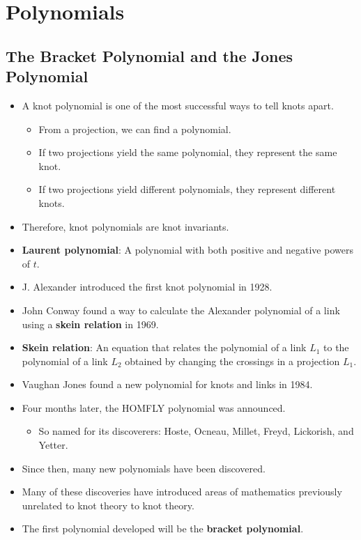 \documentclass[titlepage]{article}
\numberwithin{figure}{section}
\numberwithin{table}{section}
\numberwithin{equation}{section}
\begin{document}
\section{Polynomials}\label{sse:polynomials}
\subsection{The Bracket Polynomial and the Jones Polynomial}
\begin{itemize}
    \item A knot polynomial is one of the most successful ways to tell knots apart.
    \begin{itemize}
        \item From a projection, we can find a polynomial.
        \item If two projections yield the same polynomial, they represent the same knot.
        \item If two projections yield different polynomials, they represent different knots.
    \end{itemize}
    \item Therefore, knot polynomials are knot invariants.
    \item \textbf{Laurent polynomial}: A polynomial with both positive and negative powers of $t$.
    \item J. Alexander introduced the first knot polynomial in 1928.
    \item John Conway found a way to calculate the Alexander polynomial of a link using a \textbf{skein relation} in 1969.
    \item \textbf{Skein relation}: An equation that relates the polynomial of a link $L_1$ to the polynomial of a link $L_2$ obtained by changing the crossings in a projection $L_1$.
    \item Vaughan Jones found a new polynomial for knots and links in 1984.
    \item Four months later, the HOMFLY polynomial was announced.
    \begin{itemize}
        \item So named for its discoverers: Hoste, Ocneau, Millet, Freyd, Lickorish, and Yetter.
    \end{itemize}
    \item Since then, many new polynomials have been discovered.
    \item Many of these discoveries have introduced areas of mathematics previously unrelated to knot theory to knot theory.
    \item The first polynomial developed will be the \textbf{bracket polynomial}.

\end{itemize}
\end{document}
